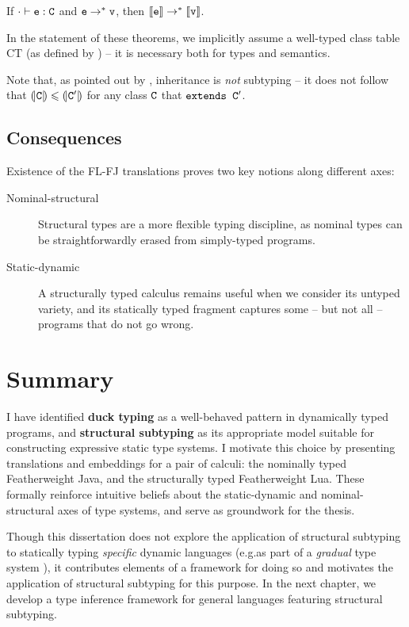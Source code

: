 \begin{theorem}
    If $\cdot \vdash \texttt{e} : \texttt{C}$ and $\texttt{e} \rightarrow^* \texttt{v}$, then $\denot{\fj e} \rightarrow^* \denot{\fj v}$.
\end{theorem}

In the statement of these theorems, we implicitly assume a well-typed class table $\mathrm{CT}$ (as defined by \textcite{featherweight-java}) -- it is necessary both for types and semantics.

Note that, as pointed out by \textcite{inheritance-subtyping}, inheritance is \emph{not} subtyping -- it does not follow that $\denoty{\fj C} \sub \denoty {\fj C'}$ for any class $\texttt{C}$ that $\texttt{extends C}'$.

\subsection{Consequences}

Existence of the FL-FJ translations proves two key notions along different axes: \begin{description}
    \item[Nominal-structural] Structural types are a more flexible typing discipline, as nominal types can be straightforwardly erased from simply-typed programs.
    \item[Static-dynamic] A structurally typed calculus remains useful when we consider its untyped variety, and its statically typed fragment captures some -- but not all -- programs that do not go wrong.
\end{description}

\section{Summary}

I have identified \textbf{duck typing} as a well-behaved pattern in dynamically typed programs, and \textbf{structural subtyping} as its appropriate model suitable for constructing expressive static type systems. I motivate this choice by presenting translations and embeddings for a pair of calculi: the nominally typed Featherweight Java, and the structurally typed Featherweight Lua. These formally reinforce intuitive beliefs about the static-dynamic and nominal-structural axes of type systems, and serve as groundwork for the thesis.

Though this dissertation does not explore the application of structural subtyping to statically typing \emph{specific} dynamic languages (e.g.\@ as part of a \emph{gradual} type system \cite{gradual-typing-for-objects}), it contributes elements of a framework for doing so and motivates the application of structural subtyping for this purpose. In the next chapter, we develop a type inference framework for general languages featuring structural subtyping.

